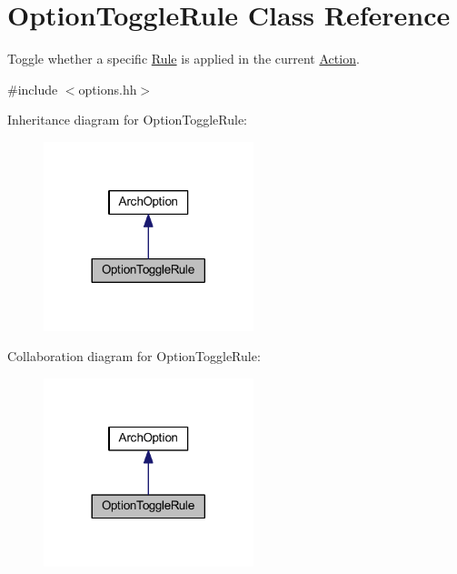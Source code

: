 \hypertarget{class_option_toggle_rule}{}\section{Option\+Toggle\+Rule Class Reference}
\label{class_option_toggle_rule}


Toggle whether a specific \mbox{\hyperlink{class_rule}{Rule}} is applied in the current \mbox{\hyperlink{class_action}{Action}}.  




{\ttfamily \#include $<$options.\+hh$>$}



Inheritance diagram for Option\+Toggle\+Rule\+:
\nopagebreak
\begin{figure}[H]
\begin{center}
\leavevmode
\includegraphics[width=173pt]{class_option_toggle_rule__inherit__graph}
\end{center}
\end{figure}


Collaboration diagram for Option\+Toggle\+Rule\+:
\nopagebreak
\begin{figure}[H]
\begin{center}
\leavevmode
\includegraphics[width=173pt]{class_option_toggle_rule__coll__graph}
\end{center}
\end{figure}
